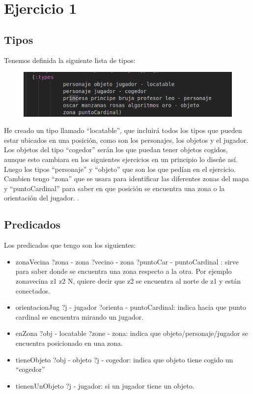 \documentclass[12pt,a4paper]{article}
\begin{document}
\section{Ejercicio 1}
\subsection{Tipos}
Tenemos definida la siguiente lista de tipos:
\begin{figure}[H]
	\centering
	\includegraphics{images/eje1Tipos}
	\caption{}
	\label{fig:eje1tipos}
\end{figure}
He creado un tipo llamado ``locatable'', que incluirá todos los tipos que pueden estar ubicados en una posición, como son los personajes, los objetos y el jugador. Los objetos del tipo ``cogedor'' serán los que puedan tener objetos cogidos, aunque esto cambiara en los siguientes ejercicios en un principio lo diseñe así. Luego los tipos ``personaje'' y ``objeto'' que son los que pedían en el ejercicio. Cambien tengo ``zona'' que se usara para identificar las diferentes zonas del mapa y ``puntoCardinal'' para saber en que posición se encuentra una zona o la orientación del jugador. . 
\subsection{Predicados}
Los predicados que tengo son los siguientes:
\begin{itemize}
	\item zonaVecina ?zona - zona ?vecino - zona ?puntoCar - puntoCardinal : sirve para saber donde se encuentra una zona respecto a la otra. Por ejemplo zonavecina z1 z2 N, quiere decir que z2 se encuentra al norte de z1 y están conectados. 
	\item orientacionJug ?j - jugador ?orienta - puntoCardinal: indica hacia que punto cardinal se encuentra mirando un jugador.
	\item enZona ?obj - locatable ?zone - zona: indica que objeto/personaje/jugador se encuentra posicionado en una zona. 
	\item tieneObjeto ?obj - objeto ?j - cogedor: indica que objeto tiene cogido un ``cogedor''
	\item tienenUnObjeto ?j - jugador: si un jugador tiene un objeto.
	 
\end{itemize}
\end{document}
